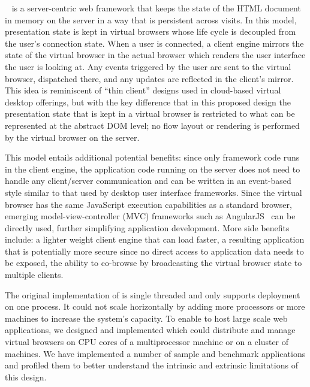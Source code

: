 \cb{}~\cite{mcdaniel2012cloudbrowser} is a server-centric web framework 
that keeps the state of the HTML document in memory 
on the server in a way that is persistent across visits.
In this model, presentation state is kept in virtual browsers whose life
cycle is decoupled from the user's connection state.  When a user is connected,
a client engine mirrors the state of the virtual browser in the actual browser which
renders the user interface the user is looking at.  Any events triggered by the
user are sent to the virtual browser, dispatched there, and any updates
are reflected in the client's mirror.  This idea is reminiscent of 
``thin client'' designs used in cloud-based virtual desktop offerings,
but with the key difference that in this proposed design the presentation state
that is kept in a virtual browser is restricted to what can be represented at the
abstract DOM level; no flow layout or rendering is performed by the virtual browser on the 
server.

This model entails additional potential benefits: since only framework code runs in
the client engine, the application code running on the server does not need
to handle any client/server communication and can be written in an event-based
style similar to that used by desktop user interface frameworks.
Since the virtual browser has the same JavaScript execution capabilities as a
standard browser, emerging model-view-controller (MVC) frameworks such as 
AngularJS~\cite{hevery2009angular} can be directly used, further simplifying application development.
More side benefits include: a lighter weight client engine that can load faster,
a resulting application that is potentially more secure since no direct access to
application data needs to be exposed, the ability to co-browse by broadcasting
the virtual browser state to multiple clients.

The original implementation of \cb{} is single threaded and
only supports deployment on one process.
It could not scale horizontally by adding more processors or more machines
to increase the system's capacity.
To enable \cb{} to host large scale web applications,
we designed and implemented \cbtwo which could distribute and manage
virtual browsers on CPU cores of a multiprocessor machine or on a cluster of machines.
We have implemented a number of sample and benchmark
applications and profiled them to better understand the intrinsic and extrinsic
limitations of this design.


\webscaleoutfig{}

